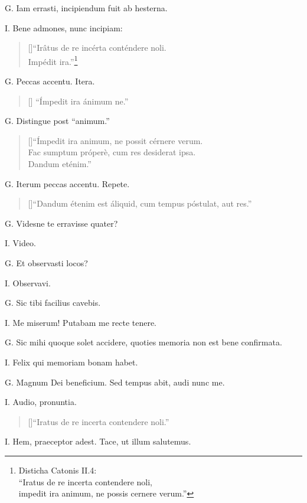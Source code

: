 \documentclass{article}
\begin{document}
G. Iam errasti, incipiendum fuit ab hesterna.

I. Bene admones, nunc incipiam: \begin{verse}[\versewidth]``Irâtus de re incérta conténdere noli.\\ Impédit ira.''\footnote{Disticha Catonis II.4:\\``Iratus de re incerta contendere noli,\\impedit ira animum, ne possis cernere verum.''}\end{verse}

G. Peccas accentu. Itera.

\begin{verse}[\versewidth] ``Ímpedit ira ánimum ne.''\end{verse}

G. Distingue post ``animum.''

\begin{verse}[\versewidth]``Ímpedit ira animum, ne possit cérnere verum.\\ Fac sumptum próperè, cum res desiderat ipsa.\\ Dandum eténim.''\end{verse}

G. Iterum peccas accentu. Repete.

\begin{verse}[\versewidth]``Dandum étenim est áliquid, cum tempus póstulat, aut res.''\end{verse}

G. Videsne te erravisse quater?

I. Video.

G. Et observasti locos?

I. Observavi.

G. Sic tibi facilius cavebis.

I. Me miserum! Putabam me recte tenere.

G. Sic mihi quoque solet accidere, quoties memoria non est bene confirmata.

I. Felix qui memoriam bonam habet.

G. Magnum Dei beneficium. Sed tempus abit, audi nunc me.

I. Audio, pronuntia.

\begin{verse}[\versewidth]``Iratus de re incerta contendere noli.''\end{verse}

I. Hem, praeceptor adest. Tace, ut illum salutemus.
\end{document}
